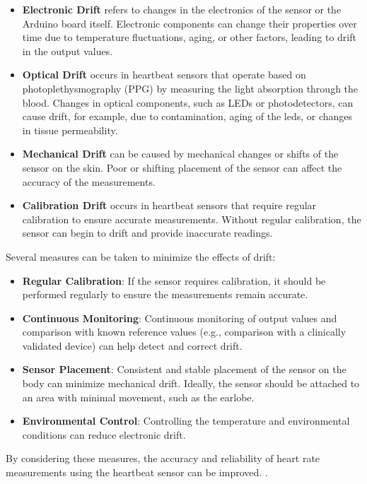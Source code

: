 {\begin{itemize}[label={}]
    \item \textbf{Electronic Drift} refers to changes in the electronics of the sensor or the Arduino board itself. Electronic components can change their properties over time due to temperature fluctuations, aging, or other factors, leading to drift in the output values.
    \item \textbf{Optical Drift} occurs in heartbeat sensors that operate based on photoplethysmography (PPG) by measuring the light absorption through the blood. Changes in optical components, such as LEDs or photodetectors, can cause drift, for example, due to contamination, aging of the \ac{led}s, or changes in tissue permeability.
    \item \textbf{Mechanical Drift} can be caused by mechanical changes or shifts of the sensor on the skin. Poor or shifting placement of the sensor can affect the accuracy of the measurements.
    \item \textbf{Calibration Drift} occurs in heartbeat sensors that require regular calibration to ensure accurate measurements. Without regular calibration, the sensor can begin to drift and provide inaccurate readings.
\end{itemize}

Several measures can be taken to minimize the effects of drift:

\begin{itemize}[label={}]
    
    \item \textbf{Regular Calibration}: If the sensor requires calibration, it should be performed regularly to ensure the measurements remain accurate.
    \item \textbf{Continuous Monitoring}: Continuous monitoring of output values and comparison with known reference values (e.g., comparison with a clinically validated device) can help detect and correct drift.
    \item \textbf{Sensor Placement}: Consistent and stable placement of the sensor on the body can minimize mechanical drift. Ideally, the sensor should be attached to an area with minimal movement, such as the earlobe.
    \item \textbf{Environmental Control}: Controlling the temperature and environmental conditions can reduce electronic drift.
\end{itemize}


By considering these measures, the accuracy and reliability of heart rate measurements using the heartbeat sensor can be improved. \cite{Traenkler:2014}. 
}



